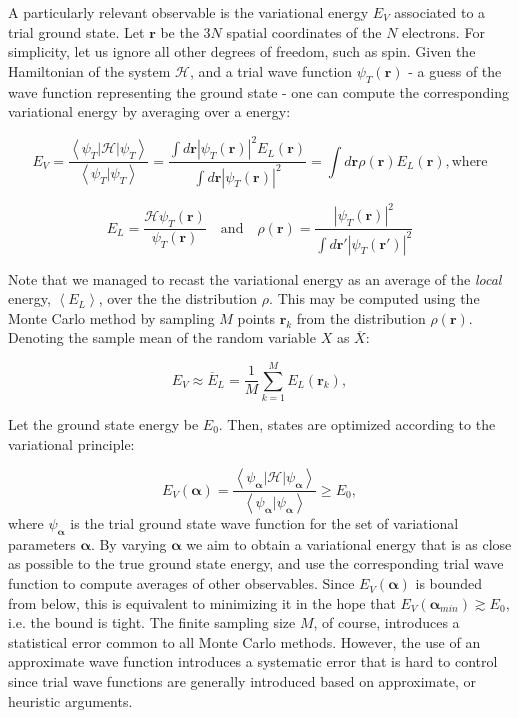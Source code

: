 A particularly relevant observable is the variational energy $E_V$ associated to a trial ground state.
Let $\bm r$ be the $3N$ spatial coordinates of the $N$ electrons.
For simplicity, let us ignore all other degrees of freedom, such as spin.
Given the Hamiltonian of the system $\mathcal{H}$, and a trial wave function $\psi_T (\bm r)$ - a guess of the wave function representing the ground state - one can compute the corresponding variational energy by averaging over a  energy:

\begin{equation}\label{eq:variational_energy}
E_V = \frac{\left\langle \psi_T | \mathcal{H} | \psi_T \right \rangle}{\left\langle \psi_T | \psi_T \right \rangle} = \frac{ \int d\bm r |\psi_T (\bm r)|^2 E_L (\bm r)}{\int d\bm r | \psi_T (\bm r)|^2 } = \int d\bm r\rho (\bm r) E_L (\bm r) , \text{where}
\end{equation}

\begin{equation}\label{eq:local_energy}
E_L = \frac{\mathcal{H} \psi_T (\bm r) }{\psi_T (\bm r)}   \quad \text{and} \quad \rho (\bm r) = \frac{ | \psi_T (\bm r) |^2}{ \int d\bm r' | \psi_T (\bm r') |^2}
\end{equation}

Note that we managed to recast the variational energy as an average of the \emph{local} energy, $\left\langle E_L \right\rangle $, over the the distribution $\rho$.
This may be computed using the Monte Carlo method by sampling $M$ points $\bm r_k$ from the distribution $\rho (\bm r)$.
Denoting the sample mean of the random variable $X$ as $\overline {X}$:

\begin{equation}\label{eq:average}
E_V \approx \overline{E}_L = \frac{1}{M} \sum_{k= 1}^{M} E_L (\bm r_k) ,
\end{equation}

Let the ground state energy be $E_0$.
Then, states are optimized according to the variational principle:

\begin{equation}
E_V(\bm \alpha) = \frac{\left\langle \psi_{\bm \alpha} | \mathcal{H} | \psi_{\bm \alpha} \right\rangle}{\left\langle\psi_{\bm \alpha} | \psi_{\bm \alpha} \right\rangle} \ge E_0,
\end{equation}
where $\psi_{\bm \alpha}$ is the trial ground state wave function for the set of variational parameters ${\bm \alpha}$.
By varying $\bm \alpha$ we aim to obtain a variational energy that is as close as possible to the true ground state energy, and use the corresponding trial wave function to compute averages of other observables.
Since $E_V(\bm \alpha)$ is bounded from below, this is equivalent to minimizing it in the hope that $E_V(\bm \alpha_{min}) \gtrsim E_0$, i.e. the bound is tight.
The finite sampling size $M$, of course, introduces a statistical error common to all Monte Carlo methods. 
However, the use of an approximate wave function introduces a systematic error that is hard to control since trial wave functions are generally introduced based on approximate, or heuristic arguments.


